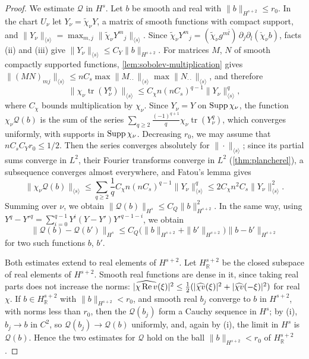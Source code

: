 \begin{proof}
We estimate $\mathcal Q$ in $H^s$. Let $b$ be smooth and real with $\|b\|_{H^{s+2}}\leq r_0$. In the chart $U_\nu$ let $Y_\nu=\tilde\chi_\nu Y$, a matrix of smooth functions with compact support, and $\|Y_\nu\|_{\langle s\rangle}=\max_{m,j}\|\tilde\chi_\nu Y^m{}_j\|_{\langle s\rangle}$. Since $\tilde\chi_\nu Y^m{}_j=(\tilde\chi_\nu g^{m\bar l})\,\partial_j\partial_{\bar l}(\check\chi_\nu b)$, facts (ii) and (iii) give $\|Y_\nu\|_{\langle s\rangle}\leq C_Y\|b\|_{H^{s+2}}$. For matrices $M$, $N$ of smooth compactly supported functions, \cref{lem:sobolev-multiplication} gives $\|(MN)_{mj}\|_{\langle s\rangle}\leq nC_s\max\|M_{\cdot\cdot}\|_{\langle s\rangle}\max\|N_{\cdot\cdot}\|_{\langle s\rangle}$, and therefore
\[
 \|\chi_\nu\operatorname{tr}(Y_\nu^q)\|_{\langle s\rangle}\leq C_\chi n(nC_s)^{q-1}\|Y_\nu\|_{\langle s\rangle}^q,
\]
where $C_\chi$ bounds multiplication by $\chi_\nu$. Since $Y_\nu=Y$ on $\operatorname{Supp}\chi_\nu$, the function $\chi_\nu\mathcal Q(b)$ is the sum of the series $\sum_{q\geq2}\frac{(-1)^{q+1}}q\chi_\nu\operatorname{tr}(Y_\nu^q)$, which converges uniformly, with supports in $\operatorname{Supp}\chi_\nu$. Decreasing $r_0$, we may assume that $nC_sC_Yr_0\leq1/2$. Then the series converges absolutely for $\|\cdot\|_{\langle s\rangle}$; since its partial sums converge in $L^2$, their Fourier transforms converge in $L^2$ (\cref{thm:plancherel}), a subsequence converges almost everywhere, and Fatou's lemma gives
\[
 \|\chi_\nu\mathcal Q(b)\|_{\langle s\rangle}\leq\sum_{q\geq2}\frac1qC_\chi n(nC_s)^{q-1}\|Y_\nu\|_{\langle s\rangle}^q\leq2C_\chi n^2C_s\|Y_\nu\|_{\langle s\rangle}^2.
\]
Summing over $\nu$, we obtain $\|\mathcal Q(b)\|_{H^s}\leq C_Q\|b\|_{H^{s+2}}^2$. In the same way, using $Y^q-Y'^q=\sum_{i=0}^{q-1}Y^i(Y-Y')Y'^{q-1-i}$, we obtain
\[
 \|\mathcal Q(b)-\mathcal Q(b')\|_{H^s}\leq C_Q\bigl(\|b\|_{H^{s+2}}+\|b'\|_{H^{s+2}}\bigr)\|b-b'\|_{H^{s+2}}
\]
for two such functions $b$, $b'$.

Both estimates extend to real elements of $H^{s+2}$. Let $H^{s+2}_{\mathbb R}$ be the closed subspace of real elements of $H^{s+2}$. Smooth real functions are dense in it, since taking real parts does not increase the norms: $|\widehat{\chi\operatorname{Re} v}(\xi)|^2\leq\frac12(|\widehat{\chi v}(\xi)|^2+|\widehat{\chi v}(-\xi)|^2)$ for real $\chi$. If $b\in H^{s+2}_{\mathbb R}$ with $\|b\|_{H^{s+2}}<r_0$, and smooth real $b_j$ converge to $b$ in $H^{s+2}$, with norms less than $r_0$, then the $\mathcal Q(b_j)$ form a Cauchy sequence in $H^s$; by (i), $b_j\to b$ in $C^2$, so $\mathcal Q(b_j)\to\mathcal Q(b)$ uniformly, and, again by (i), the limit in $H^s$ is $\mathcal Q(b)$. Hence the two estimates for $\mathcal Q$ hold on the ball $\|b\|_{H^{s+2}}<r_0$ of $H^{s+2}_{\mathbb R}$.


\end{proof}
